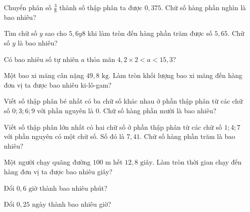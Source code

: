 \begin{ex}
  Chuyển phân số $\frac{3}{8}$ thành số thập phân ta được $0{,}375$. Chữ số hàng phần nghìn là bao nhiêu?
\end{ex}

\begin{ex}
  Tìm chữ số $y$ sao cho $5{,}6y8$ khi làm tròn đến hàng phần trăm được số $5{,}65$. Chữ số $y$ là bao nhiêu?
\end{ex}

\begin{ex}
  Có bao nhiêu số tự nhiên $a$ thỏa mãn $4{,}2 \times 2 < a < 15{,}3$?
\end{ex}

\begin{ex}
  Một bao xi măng cân nặng $49{,}8\text{ kg}$. Làm tròn khối lượng bao xi măng đến hàng đơn vị ta được bao nhiêu ki-lô-gam?
\end{ex}

\begin{ex}
  Viết số thập phân bé nhất có ba chữ số khác nhau ở phần thập phân từ các chữ số $0; 3; 6; 9$ với phần nguyên là $0$. Chữ số hàng phần mười là bao nhiêu?
\end{ex}

\begin{ex}
  Viết số thập phân lớn nhất có hai chữ số ở phần thập phân từ các chữ số $1; 4; 7$ với phần nguyên có một chữ số. Số đó là $7{,}41$. Chữ số hàng phần trăm là bao nhiêu?
\end{ex}

\begin{ex}
  Một người chạy quãng đường $100\text{ m}$ hết $12{,}8\text{ giây}$. Làm tròn thời gian chạy đến hàng đơn vị ta được bao nhiêu giây?
\end{ex}

\begin{ex}
  Đổi $0{,}6\text{ giờ}$ thành bao nhiêu phút?
\end{ex}

\begin{ex}
  Đổi $0{,}25\text{ ngày}$ thành bao nhiêu giờ?
\end{ex}
